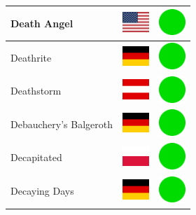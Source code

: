 \documentclass[12pt, a4paper, twoside]{report}
\begin{document}
\begin{center}
\begin{longtable}{|p{5cm}|p{2cm}|p{2cm}|}
Death Angel & \includegraphics[width=1cm]{4x3/us} & \includegraphics[width=1cm]{likes/y} \\ \hline
Deathrite & \includegraphics[width=1cm]{4x3/de} & \includegraphics[width=1cm]{likes/y} \\ \hline
Deathstorm & \includegraphics[width=1cm]{4x3/at} & \includegraphics[width=1cm]{likes/y} \\ \hline
Debauchery's Balgeroth & \includegraphics[width=1cm]{4x3/de} & \includegraphics[width=1cm]{likes/y} \\ \hline
Decapitated & \includegraphics[width=1cm]{4x3/pl} & \includegraphics[width=1cm]{likes/y} \\ \hline
Decaying Days & \includegraphics[width=1cm]{4x3/de} & \includegraphics[width=1cm]{likes/y} \\ \hline

\end{longtable}
\end{center}
\end{document}
